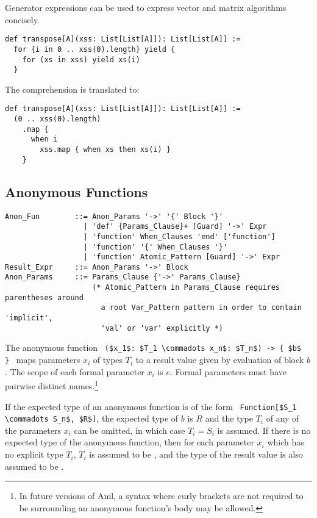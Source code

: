 \example Generator expressions can be used to express vector and matrix algorithms concisely.
\begin{lstlisting}
def transpose[A](xss: List[List[A]]): List[List[A]] :=
  for {i in 0 .. xss(0).length} yield {
    for (xs in xss) yield xs(i)
  }
\end{lstlisting} 
The comprehension is translated to: 
\begin{lstlisting}
def transpose[A](xss: List[List[A]]): List[List[A]] := 
  (0 .. xss(0).length)
    .map { 
      when i 
        xss.map { when xs then xs(i) }
    }
\end{lstlisting}






\subsection{Anonymous Functions}
\label{sec:anonymous-functions}

\syntax\begin{lstlisting}
Anon_Fun        ::= Anon_Params '->' '{' Block '}'
                  | 'def' {Params_Clause}+ [Guard] '->' Expr
                  | 'function' When_Clauses 'end' ['function']
                  | 'function' '{' When_Clauses '}'
                  | 'function' Atomic_Pattern [Guard] '->' Expr
Result_Expr     ::= Anon_Params '->' Block 
Anon_Params     ::= Params_Clause {'->' Params_Clause}
                    (* Atomic_Pattern in Params_Clause requires parentheses around 
                      a root Var_Pattern pattern in order to contain 'implicit', 
                      'val' or 'var' explicitly *)
\end{lstlisting}

The anonymous function ~\lstinline!($x_1$: $T_1 \commadots x_n$: $T_n$) -> { $b$ }!~ maps parameters $x_i$ of types $T_i$ to a result value given by evaluation of block $b$. The scope of each formal parameter $x_i$ is $e$. Formal parameters must have pairwise distinct names.\footnote{In future versions of Aml, a syntax where curly brackets are not required to be surrounding an anonymous function's body may be allowed.}

If the expected type of an anonymous function is of the form ~\lstinline!Function[$S_1 \commadots S_n$, $R$]!, the expected type of $b$ is $R$ and the type $T_i$ of any of the parameters $x_i$ can be omitted, in which case $T_i = S_i$ is assumed. If there is no expected type of the anonymous function, then for each parameter $x_i$ which has no explicit type $T_i$, $T_i$ is assumed to be , and the type of the result value is also assumed to be . 

